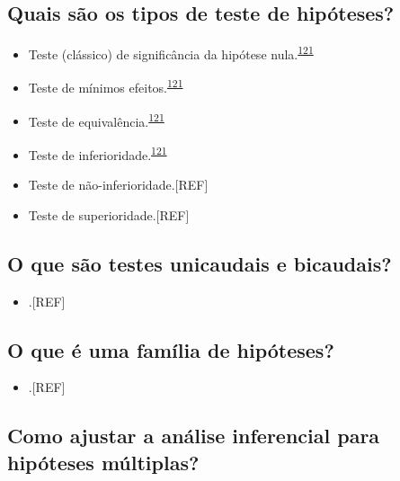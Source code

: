 \documentclass[
  a4paper,
]{book}
\providecommand{\tightlist}{%
  \setlength{\itemsep}{0pt}\setlength{\parskip}{0pt}}
\begin{document}
\hypertarget{quais-suxe3o-os-tipos-de-teste-de-hipuxf3teses}{%
\subsection{Quais são os tipos de teste de hipóteses?}\label{quais-suxe3o-os-tipos-de-teste-de-hipuxf3teses}}

\begin{itemize}
\item
  Teste (clássico) de significância da hipótese nula.\textsuperscript{\protect\hyperlink{ref-lakens2018}{121}}
\item
  Teste de mínimos efeitos.\textsuperscript{\protect\hyperlink{ref-lakens2018}{121}}
\item
  Teste de equivalência.\textsuperscript{\protect\hyperlink{ref-lakens2018}{121}}
\item
  Teste de inferioridade.\textsuperscript{\protect\hyperlink{ref-lakens2018}{121}}
\item
  Teste de não-inferioridade.{[}REF{]}
\item
  Teste de superioridade.{[}REF{]}
\end{itemize}

\hypertarget{o-que-suxe3o-testes-unicaudais-e-bicaudais}{%
\subsection{O que são testes unicaudais e bicaudais?}\label{o-que-suxe3o-testes-unicaudais-e-bicaudais}}

\begin{itemize}
\tightlist
\item
  .{[}REF{]}
\end{itemize}

\hypertarget{o-que-uxe9-uma-famuxedlia-de-hipuxf3teses}{%
\subsection{O que é uma família de hipóteses?}\label{o-que-uxe9-uma-famuxedlia-de-hipuxf3teses}}

\begin{itemize}
\tightlist
\item
  .{[}REF{]}
\end{itemize}

\hypertarget{como-ajustar-a-anuxe1lise-inferencial-para-hipuxf3teses-muxfaltiplas}{%
\subsection{Como ajustar a análise inferencial para hipóteses múltiplas?}\label{como-ajustar-a-anuxe1lise-inferencial-para-hipuxf3teses-muxfaltiplas}}
\end{document}
